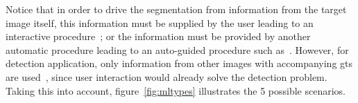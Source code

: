 \documentclass[authoryear,preprint,review,12pt]{elsarticle}
\begin{document}
Notice that in order to drive the segmentation from information from the target image itself, this information must be supplied by the user leading to an interactive procedure~\cite{Xiao:2002p5639,gerard2013}; or the information must be provided by another automatic procedure leading to an auto-guided procedure such as~\cite{Zhang:2010p14317}.
However, for detection application, only information from other images with accompanying \acp{gt} are used~\cite{massich2011seed,massich2012seed,Madabhushi:2003p6036}, since user interaction would already solve the detection problem.
Taking this into account, figure~\ref{fig:mltypes} illustrates the 5 possible scenarios.
\end{document}
